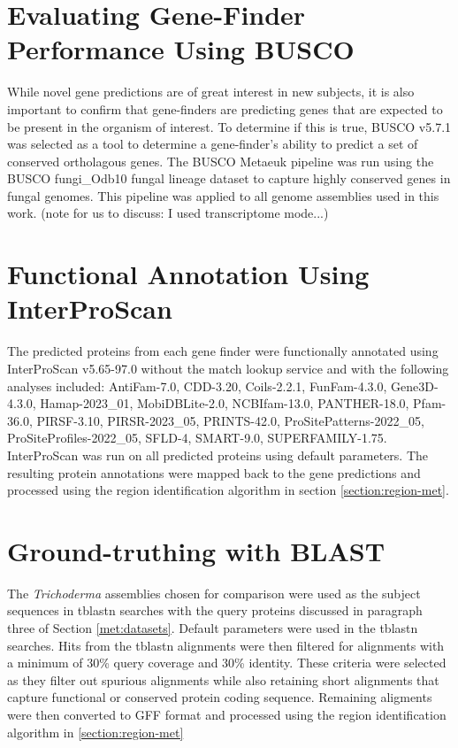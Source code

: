 \section{Evaluating Gene-Finder Performance Using BUSCO}
\label{met:busco}
While novel gene predictions are of great interest in new subjects, it
is also important to confirm that gene-finders are predicting genes
that are expected to be present in the organism of
interest\cite{https://doi.org/10.1002/cpz1.323}. To determine if this
is true, BUSCO v5.7.1\cite{10.1093/bioinformatics/btv351} was selected
as a tool to determine a gene-finder's ability to predict a set of
conserved ortholagous genes. The BUSCO Metaeuk pipeline was run using
the BUSCO fungi\_Odb10 fungal lineage dataset to capture highly
conserved genes in fungal genomes. This pipeline was applied to all
genome assemblies used in this work. (note for us to discuss: I used
transcriptome mode...)

\section{Functional Annotation Using InterProScan}
\label{met:interproscan}
The predicted proteins from each gene finder were functionally
annotated using InterProScan
v5.65-97.0\cite{10.1093/bioinformatics/btu031} without the match
lookup service and with the following analyses included: AntiFam-7.0,
CDD-3.20, Coils-2.2.1, FunFam-4.3.0, Gene3D-4.3.0, Hamap-2023\_01,
MobiDBLite-2.0, NCBIfam-13.0, PANTHER-18.0, Pfam-36.0, PIRSF-3.10,
PIRSR-2023\_05, PRINTS-42.0, ProSitePatterns-2022\_05,
ProSiteProfiles-2022\_05, SFLD-4, SMART-9.0,
SUPERFAMILY-1.75. InterProScan was run on all predicted proteins using
default parameters. The resulting protein annotations were mapped back
to the gene predictions and processed using the region identification
algorithm in section \ref{section:region-met}.

\section{Ground-truthing with BLAST}
\label{met:blast}
The \textit{Trichoderma} assemblies chosen for comparison were used as
the subject sequences in tblastn searches with the query proteins
discussed in paragraph three of Section \ref{met:datasets}. Default
parameters were used in the tblastn searches. Hits from the tblastn
alignments were then filtered for alignments with a minimum of 30\%
query coverage and 30\% identity. These criteria were selected as they
filter out spurious alignments while also retaining short alignments
that capture functional or conserved protein coding
sequence. Remaining aligments were then converted to GFF format and
processed using the region identification algorithm in
\ref{section:region-met}

